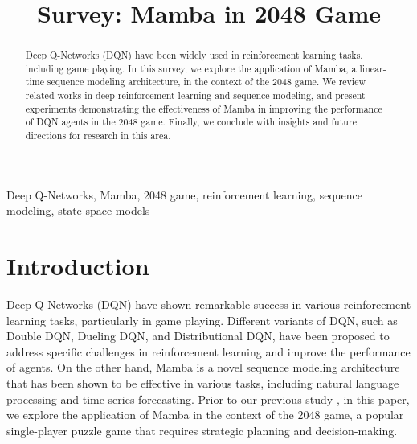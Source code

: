 \documentclass[conference]{IEEEtran}
\begin{document}
\title{Survey: Mamba in 2048 Game}

\author{
}

\maketitle

\begin{abstract}
Deep Q-Networks (DQN) have been widely used in reinforcement learning tasks, including game playing. In this survey, we explore the application of Mamba, a linear-time sequence modeling architecture, in the context of the 2048 game. We review related works in deep reinforcement learning and sequence modeling, and present experiments demonstrating the effectiveness of Mamba in improving the performance of DQN agents in the 2048 game. Finally, we conclude with insights and future directions for research in this area.
\end{abstract}

\begin{IEEEkeywords}
Deep Q-Networks, Mamba, 2048 game, reinforcement learning, sequence modeling, state space models
\end{IEEEkeywords}

\section{Introduction}

Deep Q-Networks (DQN) have shown remarkable success in various reinforcement learning tasks, particularly in game playing. Different variants of DQN, such as Double DQN, Dueling DQN, and Distributional DQN, have been proposed to address specific challenges in reinforcement learning and improve the performance of agents. On the other hand, Mamba is a novel sequence modeling architecture that has been shown to be effective in various tasks, including natural language processing and time series forecasting. Prior to our previous study \cite{dinh2024report}, in this paper, we explore the application of Mamba in the context of the 2048 game, a popular single-player puzzle game that requires strategic planning and decision-making.
\end{document}
